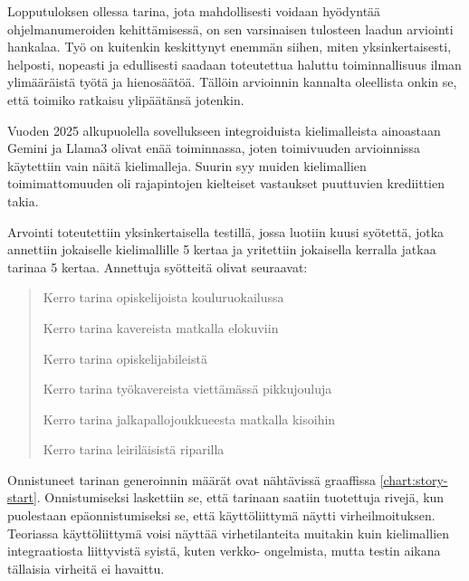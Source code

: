 Lopputuloksen ollessa tarina, jota mahdollisesti voidaan hyödyntää
ohjelmanumeroiden kehittämisessä, on sen varsinaisen tulosteen laadun arviointi
hankalaa. Työ on kuitenkin keskittynyt enemmän siihen, miten yksinkertaisesti,
helposti, nopeasti ja edullisesti saadaan toteutettua haluttu toiminnallisuus
ilman ylimääräistä työtä ja hienosäätöä. Tällöin arvioinnin kannalta oleellista
onkin se, että toimiko ratkaisu ylipäätänsä jotenkin.

Vuoden 2025 alkupuolella sovellukseen integroiduista kielimalleista ainoastaan
Gemini ja Llama3 olivat enää toiminnassa, joten toimivuuden arvioinnissa
käytettiin vain näitä kielimalleja. Suurin syy muiden kielimallien
toimimattomuuden oli rajapintojen kielteiset vastaukset puuttuvien krediittien
takia.

Arvointi toteutettiin yksinkertaisella testillä, jossa luotiin kuusi syötettä,
jotka annettiin jokaiselle kielimallille 5 kertaa ja yritettiin jokaisella
kerralla jatkaa tarinaa 5 kertaa. Annettuja syötteitä olivat seuraavat:

\begin{quotation}
    \noindent Kerro tarina opiskelijoista kouluruokailussa

    \noindent Kerro tarina kavereista matkalla elokuviin

    \noindent Kerro tarina opiskelijabileistä

    \noindent Kerro tarina työkavereista viettämässä pikkujouluja

    \noindent Kerro tarina jalkapallojoukkueesta matkalla kisoihin

    \noindent Kerro tarina leiriläisistä riparilla
\end{quotation}

Onnistuneet tarinan generoinnin määrät ovat nähtävissä graaffissa
\ref{chart:story-start}. Onnistumiseksi laskettiin se, että tarinaan saatiin
tuotettuja rivejä, kun puolestaan epäonnistumiseksi se, että käyttöliittymä
näytti virheilmoituksen. Teoriassa käyttöliittymä voisi näyttää virhetilanteita
muitakin kuin kielimallien integraatiosta liittyvistä syistä, kuten verkko-
ongelmista, mutta testin aikana tällaisia virheitä ei havaittu.

